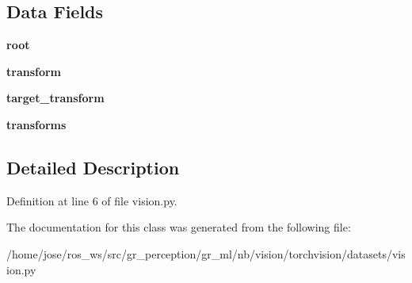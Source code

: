 \subsection*{Data Fields}
\begin{DoxyCompactItemize}
\item 
\mbox{\label{classtorchvision_1_1datasets_1_1vision_1_1VisionDataset_a6abb4f738f2e42d0c87449a2ea18d0bd}} 
{\bfseries root}
\item 
\mbox{\label{classtorchvision_1_1datasets_1_1vision_1_1VisionDataset_a03de25aa3644bca2612cc4236a77b0c0}} 
{\bfseries transform}
\item 
\mbox{\label{classtorchvision_1_1datasets_1_1vision_1_1VisionDataset_aea9eff124fe2b0848e6aa29bf6395dc2}} 
{\bfseries target\+\_\+transform}
\item 
\mbox{\label{classtorchvision_1_1datasets_1_1vision_1_1VisionDataset_a16f87b3136f02d09188d8d33917a7e12}} 
{\bfseries transforms}
\end{DoxyCompactItemize}


\subsection{Detailed Description}


Definition at line 6 of file vision.\+py.



The documentation for this class was generated from the following file\+:\begin{DoxyCompactItemize}
\item 
/home/jose/ros\+\_\+ws/src/gr\+\_\+perception/gr\+\_\+ml/nb/vision/torchvision/datasets/vision.\+py\end{DoxyCompactItemize}
